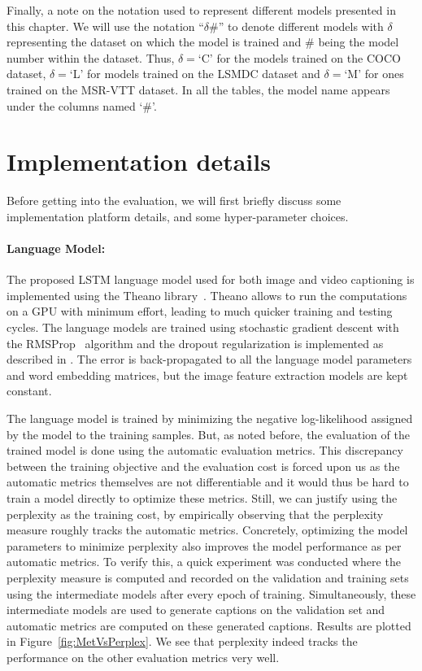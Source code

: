 Finally, a note on the notation used to represent different models presented
in this chapter.
We will use the notation ``$\delta\#$'' to denote different models with $\delta$
representing the dataset on which the model is trained and $\#$ being the model
number within the dataset.
Thus, $\delta=$`C' for the models trained on the COCO dataset, $\delta=$`L' for
models trained on the LSMDC dataset and $\delta=$`M' for ones trained on the
MSR-VTT dataset.
In all the tables, the model name appears under the columns named `\#'.

\section{Implementation details}
Before getting into the evaluation, we will first briefly discuss some
implementation platform details, and some hyper-parameter choices.
\paragraph*{Language Model:} The proposed LSTM language model used
for both image and video captioning is implemented using the Theano
library~\cite{Bastien-Theano-2012}.
Theano allows to run the computations on a GPU with minimum effort, leading to
much quicker training and testing cycles.
The language models are trained using stochastic gradient descent with the
RMSProp~\cite{rmspropTielman} algorithm and the dropout regularization is
implemented as described in \cite{ZarembaSV14}.
The error is back-propagated to all the language model parameters and word
embedding matrices, but the image feature extraction models are kept constant.
%

The language model is trained by minimizing the negative log-likelihood assigned
by the model to the training samples.
But, as noted before, the evaluation of the trained model is done using the automatic
evaluation metrics.
This discrepancy between the training objective and the evaluation cost is
forced upon us as the automatic metrics themselves are not differentiable and it
would thus be hard to train a model directly to optimize these metrics.
Still, we can justify using the perplexity as the training cost, by empirically
observing that the perplexity measure roughly tracks the automatic metrics.
Concretely, optimizing the model parameters to minimize perplexity also improves the
model performance as per automatic metrics.
To verify this, a quick experiment was conducted where the perplexity measure is
computed and recorded on the validation and training sets using the intermediate
models after every epoch of training.
Simultaneously, these intermediate models are used to generate captions on the
validation set and automatic metrics are computed on these generated captions.
Results are plotted in Figure~\ref{fig:MetVsPerplex}.
We see that perplexity indeed tracks the performance on the other evaluation
metrics very well.

